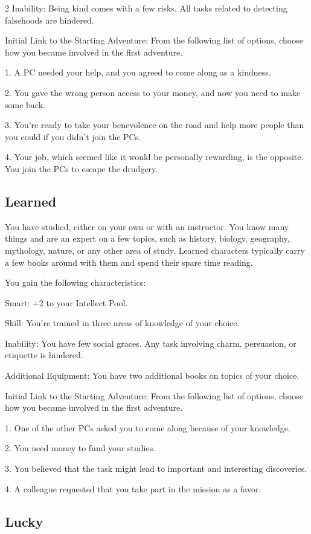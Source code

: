 \begin{multicols}{2}
Inability: Being kind comes with a few risks. All tasks related to detecting falsehoods are hindered.

Initial Link to the Starting Adventure: From the following list of options, choose how you became involved in the first adventure.

1. A PC needed your help, and you agreed to come along as a kindness.

2. You gave the wrong person access to your money, and now you need to make some back.

3. You’re ready to take your benevolence on the road and help more people than you could if you didn’t join the PCs.

4. Your job, which seemed like it would be personally rewarding, is the opposite. You join the PCs to escape the drudgery.

\subsection{Learned}

You have studied, either on your own or with an instructor. You know many things and are an expert on a few topics, such as history, biology, geography, mythology, nature, or any other area of study. Learned characters typically carry a few books around with them and spend their spare time reading.

You gain the following characteristics:

Smart: +2 to your Intellect Pool.

Skill: You’re trained in three areas of knowledge of your choice.

Inability: You have few social graces. Any task involving charm, persuasion, or etiquette is hindered.

Additional Equipment: You have two additional books on topics of your choice.

Initial Link to the Starting Adventure: From the following list of options, choose how you became involved in the first adventure.

1. One of the other PCs asked you to come along because of your knowledge.

2. You need money to fund your studies.

3. You believed that the task might lead to important and interesting discoveries.

4. A colleague requested that you take part in the mission as a favor.

\subsection{Lucky}


\end{multicols}
